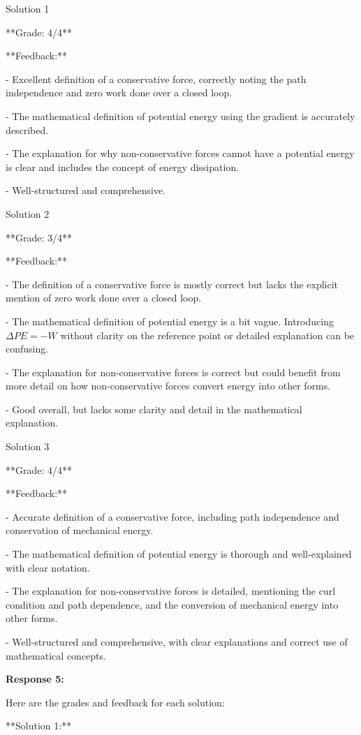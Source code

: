 \documentclass[a4paper,11pt]{article}
\begin{document}
Solution 1

**Grade: 4/4**

**Feedback:**

- Excellent definition of a conservative force, correctly noting the path independence and zero work done over a closed loop.

- The mathematical definition of potential energy using the gradient is accurately described.

- The explanation for why non-conservative forces cannot have a potential energy is clear and includes the concept of energy dissipation.

- Well-structured and comprehensive.

Solution 2

**Grade: 3/4**

**Feedback:**

- The definition of a conservative force is mostly correct but lacks the explicit mention of zero work done over a closed loop.

- The mathematical definition of potential energy is a bit vague. Introducing \( \Delta PE = -W \) without clarity on the reference point or detailed explanation can be confusing.

- The explanation for non-conservative forces is correct but could benefit from more detail on how non-conservative forces convert energy into other forms.

- Good overall, but lacks some clarity and detail in the mathematical explanation.

Solution 3

**Grade: 4/4**

**Feedback:**

- Accurate definition of a conservative force, including path independence and conservation of mechanical energy.

- The mathematical definition of potential energy is thorough and well-explained with clear notation.

- The explanation for non-conservative forces is detailed, mentioning the curl condition and path dependence, and the conversion of mechanical energy into other forms.

- Well-structured and comprehensive, with clear explanations and correct use of mathematical concepts.

\bigskip
\textbf{Response 5:}

Here are the grades and feedback for each solution:

**Solution 1:**
\end{document}
